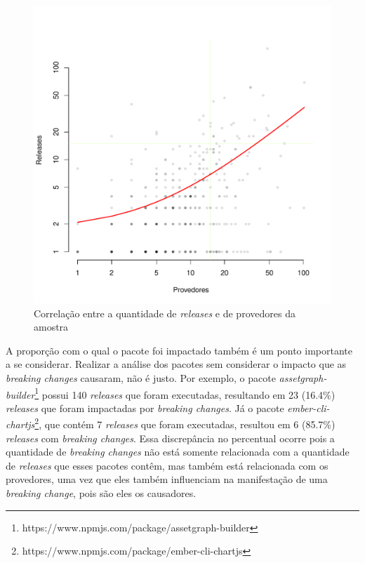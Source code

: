 \begin{figure}
    \centering
    \includegraphics[scale=0.6]{figuras/correlation_release_providers.pdf}
    \caption{Correlação entre a quantidade de \textit{releases} e de provedores da amostra}
    \label{fig:correlation_release_providers}
\end{figure}{}

A proporção com o qual o pacote foi impactado também é um ponto importante a se considerar. Realizar a análise dos pacotes sem considerar o impacto que as \textit{breaking changes} causaram, não é justo. Por exemplo, o pacote \textit{assetgraph-builder}\footnote{https://www.npmjs.com/package/assetgraph-builder} possui 140 \textit{releases} que foram executadas, resultando em 23 (16.4\%) \textit{releases} que foram impactadas por \textit{breaking changes}. Já o pacote \textit{ember-cli-chartjs}\footnote{https://www.npmjs.com/package/ember-cli-chartjs}, que contém 7 \textit{releases} que foram executadas, resultou em 6 (85.7\%) \textit{releases} com \textit{breaking changes}. Essa discrepância no percentual ocorre pois a quantidade de \textit{breaking changes} não está somente relacionada com a quantidade de  \textit{releases} que esses pacotes contêm, mas também está relacionada com os provedores, uma vez que eles também influenciam na manifestação de uma \textit{breaking change}, pois são eles os causadores.

